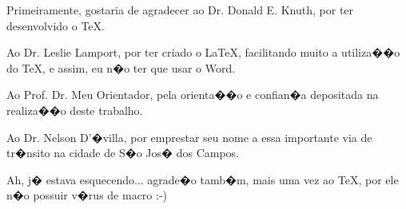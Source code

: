 Primeiramente, gostaria de agradecer ao Dr. Donald E. Knuth, por ter desenvolvido o \TeX.

Ao Dr. Leslie Lamport, por ter criado o \LaTeX, facilitando muito a utiliza��o do \TeX, e assim, eu n�o ter que usar o Word.

Ao Prof. Dr. Meu Orientador, pela orienta��o e confian�a depositada na realiza��o deste trabalho.

Ao Dr. Nelson D'�villa, por emprestar seu nome a essa importante via de tr�nsito na cidade de S�o Jos� dos Campos.

Ah, j� estava esquecendo... agrade�o tamb�m, mais uma vez ao \TeX, por ele n�o possuir v�rus de macro :-)
